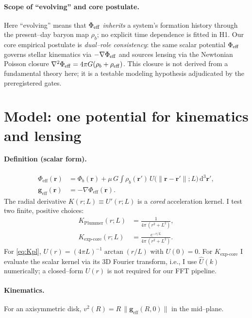\documentclass[11pt,a4paper]{article}
\newcommand{\dd}{\mathrm{d}}
\newcommand{\vect}[1]{\bm{#1}}
\newcommand{\Lmem}{L}       %
\newcommand{\gain}{\mu}     %
\newcommand{\rhob}{\rho_b}  %
\newcommand{\phieff}{\Phi_{\mathrm{eff}}}
\newcommand{\geff}{\vect{g}_{\mathrm{eff}}}
\begin{document}
\paragraph{Scope of “evolving” and core postulate.}
Here “evolving” means that $\Phi_{\rm eff}$ \emph{inherits} a system’s formation history through the present–day baryon map $\rho_b$; no explicit time dependence is fitted in H1. Our core empirical postulate is \emph{dual–role consistency}: the same scalar potential $\Phi_{\rm eff}$ governs stellar kinematics via $-\nabla\Phi_{\rm eff}$ and sources lensing via the Newtonian Poisson closure $\nabla^2\Phi_{\rm eff}=4\pi G(\rho_b+\rho_{\rm eff})$. This closure is not derived from a fundamental theory here; it is a testable modeling hypothesis adjudicated by the preregistered gates.

\section{Model: one potential for kinematics and lensing}\label{sec:model}
\paragraph{Definition (scalar form).}

\begin{align}
\phieff(\vect{r}) &= \Phi_b(\vect{r})
+\gain\,G\!\int \rhob(\vect{r}')\,U\!\big(\lVert\vect{r}-\vect{r}'\rVert;\Lmem\big)\,\dd^3\vect{r}', \label{eq:phi_eff}\\
\geff(\vect{r}) &= -\nabla\phieff(\vect{r}). \label{eq:geff}
\end{align}
The radial derivative $K(r;\Lmem)\equiv U'(r;\Lmem)$ is a \emph{cored} acceleration kernel. I test two finite, positive choices:
\begin{align}
K_{\text{Plummer}}(r;\Lmem) &= \frac{1}{4\pi\,(r^2+\Lmem^2)}, \label{eq:Kpl}\\
K_{\exp\text{-core}}(r;\Lmem) &= \frac{e^{-r/\Lmem}}{4\pi\,(r^2+\Lmem^2)}. \label{eq:KexpCore}
\end{align}
For \eqref{eq:Kpl}, $U(r)=(4\pi\Lmem)^{-1}\arctan(r/\Lmem)$ with $U(0)=0$. For $K_{\exp\text{-core}}$ I evaluate the scalar kernel via its 3D Fourier transform, i.e., I use $\widehat{U}(k)$ numerically; a closed–form $U(r)$ is not required for our FFT pipeline.

\paragraph{Kinematics.}
For an axisymmetric disk, $v^2(R)=R\,\lVert\geff(R,0)\rVert$ in the mid–plane.
\end{document}
